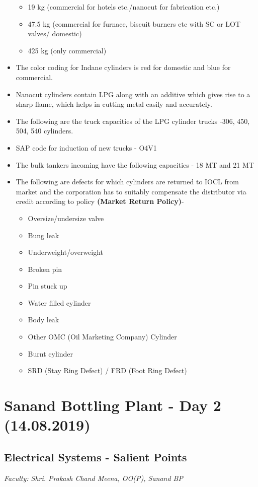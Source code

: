 \documentclass{report}
\begin{document}
\begin{itemize}
\begin{itemize}
			\item 19 kg (commercial for hotels etc./nanocut for fabrication etc.)
			\item 47.5 kg (commercial for furnace, biscuit burners etc with SC or LOT valves/ domestic)
			\item 425 kg (only commercial)
		\end{itemize}
	\item The color coding for Indane cylinders is red for domestic and blue for commercial.
	\item Nanocut cylinders contain LPG along with an additive which gives rise to a sharp flame, which helps in cutting metal easily and accurately.
	\item The following are the truck capacities of the LPG cylinder trucks -306, 450, 504, 540 cylinders.
	\item SAP code for induction of new trucks - O4V1
	\item The bulk tankers incoming have the following capacities - 18 MT and 21 MT
	\item The following are defects for which cylinders are returned to IOCL from market and the corporation has to suitably compensate the distributor via credit according to policy \textbf{(Market Return Policy)}-
	\begin{itemize}
		\item Oversize/undersize valve
		\item Bung leak
		\item Underweight/overweight
		\item Broken pin
		\item Pin stuck up
		\item Water filled cylinder
		\item Body leak
		\item Other OMC (Oil Marketing Company) Cylinder
		\item Burnt cylinder
		\item SRD (Stay Ring Defect) / FRD (Foot Ring Defect)
	\end{itemize}
	\end{itemize}

	
	\section{Sanand Bottling Plant - Day 2 (14.08.2019)}
	\subsection{Electrical Systems - Salient Points}
	\textit{Faculty: Shri. Prakash Chand Meena, OO(P), Sanand BP}\\
\end{document}
